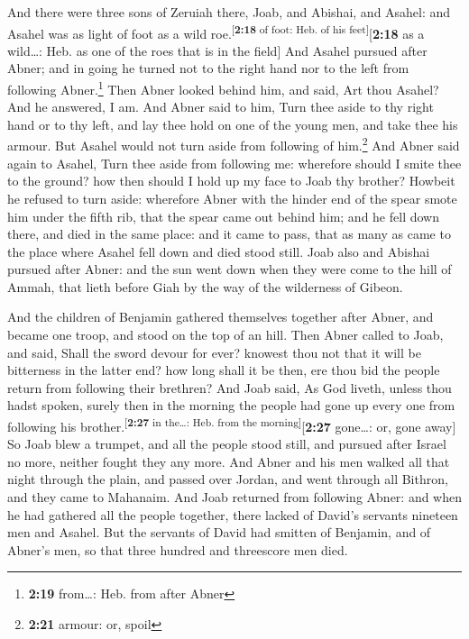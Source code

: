  And there were three sons of Zeruiah there, Joab, and
Abishai, and Asahel: and Asahel was as light of foot as a wild
roe.\textsuperscript{{[}\textbf{2:18} of foot: Heb. of his
feet{]}}{[}\textbf{2:18} as a wild\ldots: Heb. as one of the roes that
is in the field{]}  And Asahel pursued after Abner; and
in going he turned not to the right hand nor to the left from following
Abner.\footnote{\textbf{2:19} from\ldots: Heb. from after Abner}
 Then Abner looked behind him, and said, Art thou Asahel?
And he answered, I am.  And Abner said to him, Turn thee
aside to thy right hand or to thy left, and lay thee hold on one of the
young men, and take thee his armour. But Asahel would not turn aside
from following of him.\footnote{\textbf{2:21} armour: or, spoil}
 And Abner said again to Asahel, Turn thee aside from
following me: wherefore should I smite thee to the ground? how then
should I hold up my face to Joab thy brother?  Howbeit he
refused to turn aside: wherefore Abner with the hinder end of the spear
smote him under the fifth rib, that the spear came out behind him; and
he fell down there, and died in the same place: and it came to pass,
that as many as came to the place where Asahel fell down and died stood
still.  Joab also and Abishai pursued after Abner: and
the sun went down when they were come to the hill of Ammah, that lieth
before Giah by the way of the wilderness of Gibeon.

 And the children of Benjamin gathered themselves
together after Abner, and became one troop, and stood on the top of an
hill.  Then Abner called to Joab, and said, Shall the
sword devour for ever? knowest thou not that it will be bitterness in
the latter end? how long shall it be then, ere thou bid the people
return from following their brethren?  And Joab said, As
God liveth, unless thou hadst spoken, surely then in the morning the
people had gone up every one from following his
brother.\textsuperscript{{[}\textbf{2:27} in the\ldots: Heb. from the
morning{]}}{[}\textbf{2:27} gone\ldots: or, gone away{]} 
So Joab blew a trumpet, and all the people stood still, and pursued
after Israel no more, neither fought they any more.  And
Abner and his men walked all that night through the plain, and passed
over Jordan, and went through all Bithron, and they came to Mahanaim.
 And Joab returned from following Abner: and when he had
gathered all the people together, there lacked of David's servants
nineteen men and Asahel.  But the servants of David had
smitten of Benjamin, and of Abner's men, so that three hundred and
threescore men died.

